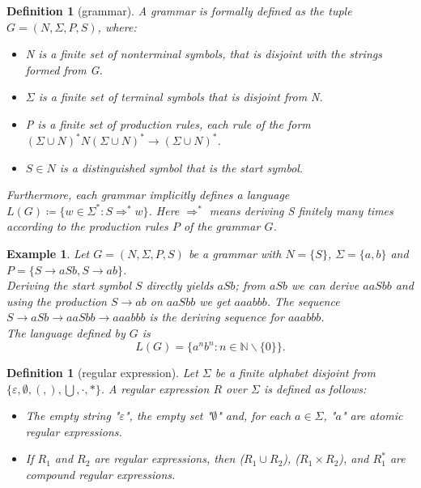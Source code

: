 \documentclass[]{article}
\newtheorem{definition}[theorem]{Definition}
\newtheorem{example}[theorem]{Example}
\numberwithin{equation}{section}
\begin{document}
\begin{definition}[grammar]
	\label{def:grammar}
	A grammar is formally defined as the tuple $G = (N,\Sigma ,P,S)$, where:
	\begin{itemize}
		\item[(i)] N is a finite set of nonterminal symbols, that is disjoint with the strings formed from G.
		\item[(ii)] $\Sigma$ is a finite set of terminal symbols that is disjoint from N.
		\item[(iii)]  P is a finite set of production rules, each rule of the form $(\Sigma \cup N)^*N(\Sigma \cup N)^*\rightarrow (\Sigma \cup N)^*$.
		\item[(iv)] $S\in N$ is a distinguished symbol that is the start symbol.
	\end{itemize}
	Furthermore, each grammar implicitly defines a language $L(G)\coloneqq \{w\in\Sigma^*:S\Rightarrow^*w\}$. Here $\Rightarrow^*$ means deriving S finitely many times according to the production rules $P$ of the grammar $G$.
\end{definition}

\begin{example}
	\label{ex:langofgrammar}
	Let $G=(N,\Sigma,P,S)$ be a grammar with $N = \{S\}$, $\Sigma = \{a,b\}$ and $P = \{S\rightarrow aSb, S \rightarrow ab\}$.\\
	Deriving the start symbol $S$ directly yields $aSb$; from $aSb$ we can derive $aaSbb$ and using the production $S \rightarrow ab$ on $aaSbb$ we get $aaabbb$.	The sequence $S \rightarrow aSb \rightarrow aaSbb \rightarrow aaabbb$ is the deriving sequence for $aaabbb$.\\
	The language defined by $G$ is 
	$$L(G)=\{a^nb^n:n\in\mathbb{N}\backslash\{0\}\}.$$
\end{example}

\begin{definition}[regular expression]
	\label{def:regex}
	Let $\Sigma$ be a finite alphabet disjoint from $\{\varepsilon, \emptyset, (, ),\bigcup, \cdot, *\}$. A regular expression $R$ over $\Sigma$ is defined as follows:
	\begin{itemize}
		\item[(i)] The empty string "$\varepsilon$", the empty set "$\emptyset$" and, for each	$a \in \Sigma$, "$a$" are atomic regular expressions.
		\item[(ii)] If $R_1$ and $R_2$ are regular expressions, then ($R_1 \cup R_2$), ($R_1 \times R_2$), and $R_1^*$	are compound regular expressions.
	\end{itemize}
\end{definition}
\end{document}
